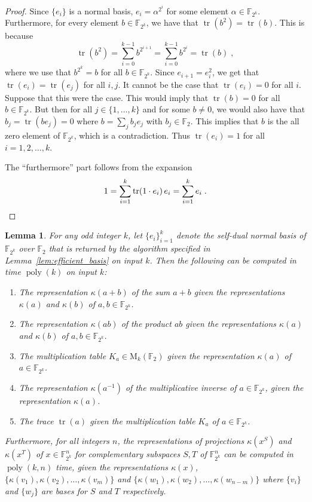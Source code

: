 \documentclass[11pt]{article}
\newtheorem{lemma}[theorem]{Lemma}
\theoremstyle{definition}
\newcommand{\F}{\ensuremath{\mathbb{F}}}
\newcommand{\downsize}{\kappa}
\DeclareMathOperator{\poly}{poly}
\DeclareMathOperator{\tr}{tr}
\newcommand{\Matrix}{\mathrm{M}}
\begin{document}
\begin{proof}
  Since $\{e_i \}$ is a normal basis, $e_i = \alpha^{2^i}$ for some element
  $\alpha \in \F_{2^k}$.
  Furthermore, for every element $b \in \F_{2^k}$, we have that $\tr(b^2) =
  \tr(b)$.
  This is because
  \[
    \tr(b^2) = \sum_{i=0}^{k-1} b^{2^{i+1}} =
    \sum_{i = 0}^{k-1} b^{2^i} = \tr(b)\;,
  \]
  where we use that $b^{2^k} = b$ for all $b \in \F_{2^k}$.
  Since $e_{i+1} = e_i^2$, we get that $\tr(e_i) = \tr(e_j)$ for all $i,j$.
  It cannot be the case that $\tr(e_i) = 0$ for all $i$.
  Suppose that this were the case.
  This would imply that $\tr(b) = 0$ for all $b \in \F_{2^k}$.
  But then for all $j \in \{1, \ldots, k\}$ and for some $b \neq 0$, we would
  also have that $b_j = \tr(b e_j) = 0$ where $b = \sum_j b_j e_j$ with $b_j \in
  \F_2$.
  This implies that $b$ is the all zero element of $\F_{2^k}$, which is a
  contradiction.
  Thus $\tr(e_i) = 1$ for all $i=1, 2, \ldots, k$.

	The ``furthermore'' part follows from the expansion
  \begin{equation*}
    1 = \sum_{i=1}^k \tr(1 \cdot e_i)\, e_i = \sum_{i=1}^k e_i\;.\qedhere
  \end{equation*}
\end{proof}

\begin{lemma}
  \label{lem:efficient_arithmetic}
  For any odd integer $k$, let $\{e_i\}_{i=1}^k$ denote the self-dual normal basis
  of $\F_{2^k}$ over $\F_2$ that is returned by the algorithm specified in
  Lemma~\ref{lem:efficient_basis} on input $k$.
  Then the following can be computed in time $\poly(k)$ on input $k$:
  \begin{enumerate}
  \item The representation $\downsize(a+b)$ of the sum $a+b$ given the
    representations $\downsize(a)$ and $\downsize(b)$ of $a, b \in \F_{2^k}$.
	\item The representation $\downsize(ab)$ of the product $ab$ given the
    representations $\downsize(a)$ and $\downsize(b)$ of $a, b \in \F_{2^k}$.
  \item The multiplication table $K_a \in \Matrix_k(\F_2)$ given the
    representation $\downsize(a)$ of  $a\in \F_{2^k}$.
  \item The representation $\downsize(a^{-1})$ of the multiplicative inverse of
    $a \in \F_{2^k}$, given the representation $\downsize(a)$.
	\item The trace $\tr(a)$ given the multiplication table $K_a$ of $a \in \F_{2^k}$.
  \end{enumerate}
  Furthermore, for all integers $n$, the representations of projections
  $\downsize(x^S)$ and $\downsize(x^T)$ of $x \in \F_{2^k}^n$ for complementary
  subspaces $S,T$ of $\F_{2^k}^n$ can be computed in $\poly(k,n)$ time, given
  the representations $\downsize(x)$, $\{\downsize(v_1), \downsize(v_2), \ldots,
  \downsize(v_m)\}$ and $\{\downsize(w_1), \downsize(w_2), \ldots,
  \downsize(w_{n - m})\}$ where $\{v_i\}$ and $\{w_j\}$ are bases for $S$ and
  $T$ respectively.
\end{lemma}
\end{document}
